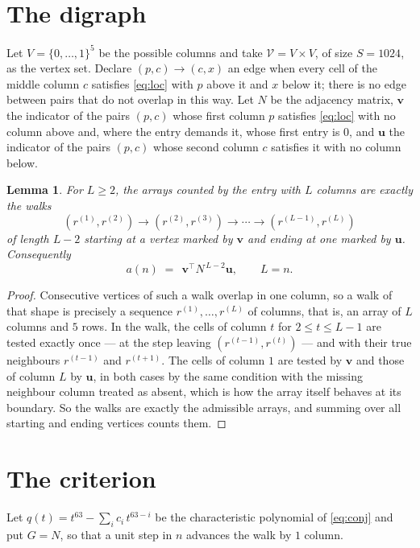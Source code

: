 \documentclass[11pt,a4paper]{article}
\theoremstyle{plain}
\newtheorem{lemma}[theorem]{Lemma}
\theoremstyle{definition}
\begin{document}
\section{The digraph}

Let $V=\{0,\dots,1\}^{5}$ be the possible columns and take
$\mathcal V=V\times V$, of size $S=1024$, as the vertex set. Declare $(p,c)\to(c,x)$ an edge
when every cell of the middle column $c$ satisfies \eqref{eq:loc} with $p$ above it and $x$
below it; there is no edge between pairs that do not overlap in this way. Let $N$ be the
adjacency matrix, $\mathbf{v}$ the indicator of the pairs $(p,c)$ whose first column $p$
satisfies \eqref{eq:loc} with no column above and, where the entry demands it, whose first entry is $0$, and $\mathbf{u}$ the indicator of
the pairs $(p,c)$ whose second column $c$ satisfies it with no column below.

\begin{lemma}\label{lem:walk}
For $L\ge2$, the arrays counted by the entry with $L$ columns are exactly the walks
\[
(r^{(1)},r^{(2)})\to(r^{(2)},r^{(3)})\to\cdots\to(r^{(L-1)},r^{(L)})
\]
of length $L-2$ starting at a vertex marked by $\mathbf{v}$ and ending at one marked by
$\mathbf{u}$. Consequently
\[
a(n)\;=\;\,\mathbf{v}^{\!\top}N^{\,L-2}\mathbf{u},\qquad L=n .
\]
\end{lemma}

\begin{proof}
Consecutive vertices of such a walk overlap in one column, so a walk of that shape is
precisely a sequence $r^{(1)},\dots,r^{(L)}$ of columns, that is, an array of $L$ columns
and $5$ rows. In the walk, the cells of column $t$ for $2\le t\le L-1$ are tested
exactly once --- at the step leaving $(r^{(t-1)},r^{(t)})$ --- and with their true
neighbours $r^{(t-1)}$ and $r^{(t+1)}$. The cells of column $1$ are tested by
$\mathbf{v}$ and those of column $L$ by $\mathbf{u}$, in both cases by the same condition
with the missing neighbour column treated as absent, which is how the array itself behaves at
its boundary. So the walks are exactly the admissible arrays, and summing over all starting
and ending vertices counts them.
\end{proof}

\section{The criterion}

Let $q(t)=t^{63}-\sum_i c_i\,t^{63-i}$ be the characteristic polynomial of
\eqref{eq:conj} and put $G=N$, so that a unit step in $n$ advances the walk by
$1$ column.
\end{document}
